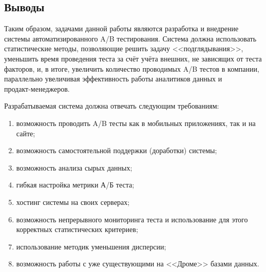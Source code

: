 \documentclass[../document.tex]{subfiles}
\begin{document}
	\subsection{Выводы}
	\par Таким образом, задачами данной работы являются разработка и внедрение системы автоматизированного A/B тестирования. Система должна использовать статистические методы, позволяющие решить задачу <<подглядывания>>, уменьшить время проведения теста за счёт учёта внешних, не зависящих от теста факторов, и, в итоге, увеличить количество проводимых A/B тестов в компании, параллельно увеличивая эффективность работы аналитиков данных и \\продакт-менеджеров.
	\par Разрабатываемая система должна отвечать следующим требованиям:
	\begin{enumerate}
		\item возможность проводить A/B тесты как в мобильных приложениях, так и на сайте;
		\item возможность самостоятельной поддержки (доработки) системы;
		\item возможность анализа сырых данных;
		\item гибкая настройка метрики А/Б теста;
		\item хостинг системы на своих серверах;
		\item возможность непрерывного мониторинга теста и использование для этого корректных статистических критериев;
		\item использование методик уменьшения дисперсии;
		\item возможность работы с уже существующими на <<Дроме>> базами данных.
	\end{enumerate}
\end{document}
